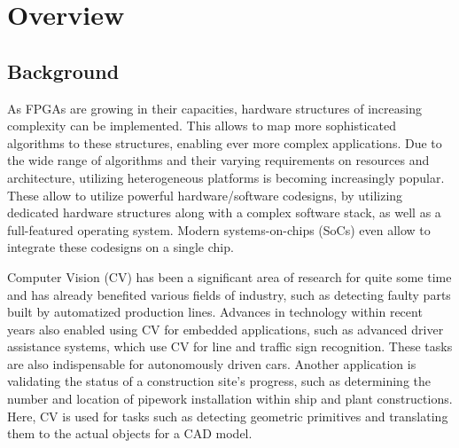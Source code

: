 




\chapter{Overview}\label{ch:01-overview}


\section{Background}


As FPGAs are growing in their capacities, hardware structures of increasing complexity can be implemented.
This allows to map more sophisticated algorithms to these structures, enabling ever more complex applications.
Due to the wide range of algorithms and their varying requirements on resources and architecture, utilizing heterogeneous platforms is becoming increasingly popular.
These allow to utilize powerful hardware/software codesigns, by utilizing dedicated hardware structures along with a complex software stack, as well as a full-featured operating system.
Modern systems-on-chips (SoCs) even allow to integrate these codesigns on a single chip.

Computer Vision (CV) has been a significant area of research for quite some time and has already benefited various fields of industry, such as detecting faulty parts built by automatized production lines. 
Advances in technology within recent years also enabled using CV for embedded applications, such as advanced driver assistance systems, which use CV for line and traffic sign recognition. 
These tasks are also indispensable for autonomously driven cars.
Another application is validating the status of a construction site's progress, such as determining the number and location of pipework installation within ship and plant constructions.
Here, CV is used for tasks such as detecting geometric primitives and translating them to the actual objects for a CAD model.

